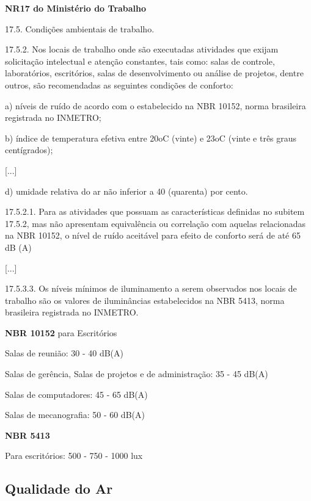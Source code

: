 \documentclass[../monografia.tex]{subfiles}
\begin{document}
\begin{citacaoLonga} %
\textbf{NR17 do Ministério do Trabalho} \cite{NR17}

17.5. Condições ambientais de trabalho.

17.5.2. Nos locais de trabalho onde são executadas atividades que exijam solicitação intelectual e atenção constantes, tais como: salas de controle, laboratórios, escritórios, salas de desenvolvimento ou análise de projetos, dentre outros, são recomendadas as seguintes condições de conforto:

a) níveis de ruído de acordo com o estabelecido na NBR 10152, norma brasileira registrada no INMETRO;

b) índice de temperatura efetiva entre 20oC (vinte) e 23oC (vinte e três graus centígrados);

[...]

d) umidade relativa do ar não inferior a 40 (quarenta) por cento.

17.5.2.1. Para as atividades que possuam as características definidas no subitem 17.5.2, mas não apresentam equivalência ou correlação com aquelas relacionadas na NBR 10152, o nível de ruído aceitável para efeito de conforto será de até 65 dB (A)

[...]

17.5.3.3. Os níveis mínimos de iluminamento a serem observados nos locais de trabalho são os valores de iluminâncias estabelecidos na NBR 5413, norma brasileira registrada no INMETRO.
\end{citacaoLonga}

\begin{citacaoLonga} %

\textbf{NBR 10152} \cite{NBR10152} para Escritórios

Salas de reunião: 30 - 40 dB(A)

Salas de gerência, Salas de projetos e de administração: 35 - 45 dB(A)

Salas de computadores: 45 - 65 dB(A)

Salas de mecanografia: 50 - 60 dB(A)

\textbf{NBR 5413} \cite{NBR5413}

Para escritórios: 500 - 750 - 1000 lux
\end{citacaoLonga}

\subsection{Qualidade do Ar} %
\end{document}
